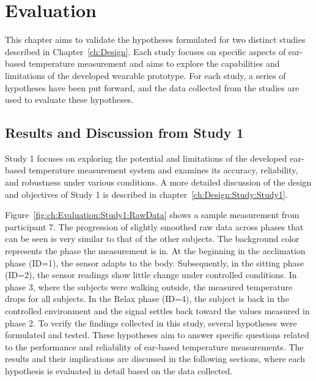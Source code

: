\chapter{Evaluation}
\label{ch:Evaluation}
This chapter aims to validate the hypotheses formulated for two distinct studies described in Chapter~\ref{ch:Design}. 
Each study focuses on specific aspects of ear-based temperature measurement and aims to explore the capabilities and limitations of the developed wearable prototype. 
For each study, a series of hypotheses have been put forward, and the data collected from the studies are used to evaluate these hypotheses.

\section{Results and Discussion from Study 1}
\label{sec:Evaluation:Study1}
Study 1 focuses on exploring the potential and limitations of the developed ear-based temperature measurement system and examines its accuracy, reliability, and robustness under various conditions. 
A more detailed discussion of the design and objectives of Study 1 is described in chapter~\ref{ch:Design:Study:Study1}.

Figure~\ref{fig:ch:Evaluation:Study1:RawData} shows a sample measurement from participant 7.
The progression of slightly smoothed raw data across phases that can be seen is very similar to that of the other subjects. 
The background color represents the phase the measurement is in.
At the beginning in the acclimation phase (ID=1), the sensor adapts to the body. 
Subsequently, in the sitting phase (ID=2), the sensor readings show little change under controlled conditions.
In phase 3, where the subjects were walking outside, the measured temperature drops for all subjects.
In the Relax phase (ID=4), the subject is back in the controlled environment and the signal settles back toward the values measured in phase 2.
To verify the findings collected in this study, several hypotheses were formulated and tested. 
These hypotheses aim to answer specific questions related to the performance and reliability of ear-based temperature measurements. 
The results and their implications are discussed in the following sections, where each hypothesis is evaluated in detail based on the data collected.

